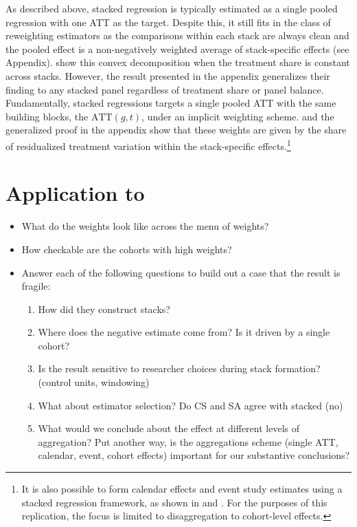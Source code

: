 \documentclass[12pt]{article}
\begin{document}
As described above, stacked regression is typically estimated as a single pooled regression with one ATT as the target. Despite this, it still fits in the class of reweighting estimators as the comparisons within each stack are always clean and the pooled effect is a non-negatively weighted average of stack-specific effects (see Appendix). \textcite{wing2024stacked} show this convex decomposition when the treatment share is constant across stacks. However, the result presented in the appendix generalizes their finding to any stacked panel regardless of treatment share or panel balance. Fundamentally, stacked regressions targets a single pooled ATT with the same building blocks, the $\text{ATT}(g,t)$, under an implicit weighting scheme. \textcite{wing2024stacked} and the generalized proof in the appendix show that these weights are given by the share of residualized treatment variation within the stack-specific effects.\footnote{It is also possible to form calendar effects and event study estimates using a stacked regression framework, as shown in \textcite{cengiz2019effect} and \textcite{wing2024stacked}. For the purposes of this replication, the focus is limited to disaggregation to cohort-level effects.}


\section{Application to \textcite{payson2025residency}}

\begin{itemize}
    \item What do the weights look like across the menu of weights?
    \item How checkable are the cohorts with high weights?
    \item Answer each of the following questions to build out a case that the result is fragile:
    \begin{enumerate}
        \item How did they construct stacks?
        \item Where does the negative estimate come from? Is it driven by a single cohort?
        \item Is the result sensitive to researcher choices during stack formation? (control units, windowing)
        \item What about estimator selection? Do CS and SA agree with stacked (no)
        \item What would we conclude about the effect at different levels of aggregation? Put another way, is the aggregations scheme (single ATT, calendar, event, cohort effects) important for our substantive conclusions?
        \end{enumerate}
\end{itemize}
\end{document}
